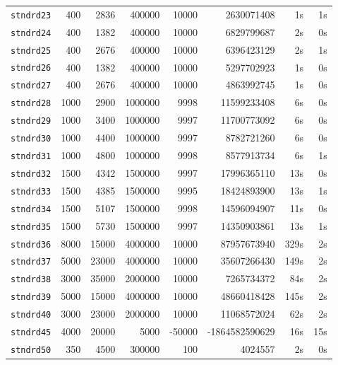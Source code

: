 \documentclass[a4paper,11pt,twoside]{book}
\begin{document}
\begin{multicols}{2}
\begin{center}
\begin{tabular}{|lrrrrrrr|}
\verb/stndrd23/&     400 &    2836 &   400000 &    10000 &     2630071408 &        1s &    1s \\
\verb/stndrd24/&     400 &    1382 &   400000 &    10000 &     6829799687 &        2s &    0s \\
\verb/stndrd25/&     400 &    2676 &   400000 &    10000 &     6396423129 &        2s &    1s \\
\verb/stndrd26/&     400 &    1382 &   400000 &    10000 &     5297702923 &        1s &    0s \\
\verb/stndrd27/&     400 &    2676 &   400000 &    10000 &     4863992745 &        1s &    0s \\
\verb/stndrd28/&    1000 &    2900 &  1000000 &     9998 &    11599233408 &        6s &    0s \\
\verb/stndrd29/&    1000 &    3400 &  1000000 &     9997 &    11700773092 &        6s &    0s \\
\verb/stndrd30/&    1000 &    4400 &  1000000 &     9997 &     8782721260 &        6s &    0s \\
\verb/stndrd31/&    1000 &    4800 &  1000000 &     9998 &     8577913734 &        6s &    1s \\
\verb/stndrd32/&    1500 &    4342 &  1500000 &     9997 &    17996365110 &       13s &    0s \\
\verb/stndrd33/&    1500 &    4385 &  1500000 &     9995 &    18424893900 &       13s &    1s \\
\verb/stndrd34/&    1500 &    5107 &  1500000 &     9998 &    14596094907 &       11s &    0s \\
\verb/stndrd35/&    1500 &    5730 &  1500000 &     9997 &    14350903861 &       13s &    1s \\
\verb/stndrd36/&    8000 &   15000 &  4000000 &    10000 &    87957673940 &      329s &    2s \\
\verb/stndrd37/&    5000 &   23000 &  4000000 &    10000 &    35607266430 &      149s &    2s \\
\verb/stndrd38/&    3000 &   35000 &  2000000 &    10000 &     7265734372 &       84s &    2s \\
\verb/stndrd39/&    5000 &   15000 &  4000000 &    10000 &    48660418428 &      145s &    2s \\
\verb/stndrd40/&    3000 &   23000 &  2000000 &    10000 &    11068572024 &       62s &    2s \\
\verb/stndrd45/&    4000 &   20000 &     5000 &   -50000 & -1864582590629 &       16s &   15s \\
\verb/stndrd50/&     350 &    4500 &   300000 &      100 &        4024557 &        2s &    0s \\
\hline
\end{tabular}
\end{center}




\end{multicols}
\end{document}
